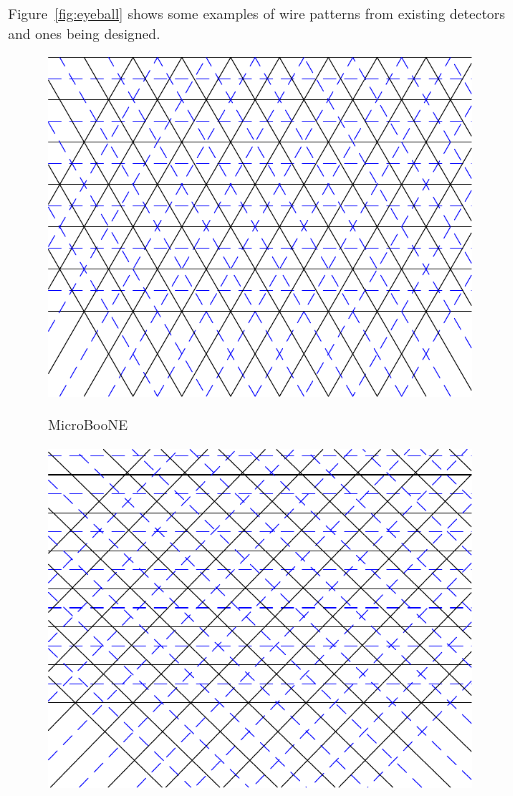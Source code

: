 \documentclass[letter]{article}
\begin{document}
Figure~\ref{fig:eyeball} shows some examples of wire patterns from
existing detectors and ones being designed.

\begin{figure}[htbp]
  \centering

  \begin{minipage}[b]{0.3\linewidth}
    \begin{center}
        \includegraphics[width=\textwidth]{wires-uboone.pdf}              

        MicroBooNE
    \end{center}
  \end{minipage}
  \begin{minipage}[b]{0.3\linewidth}
    \begin{center}
        \includegraphics[width=\textwidth]{wires-35t.pdf}      


\end{center}
\end{minipage}
\end{figure}
\end{document}
